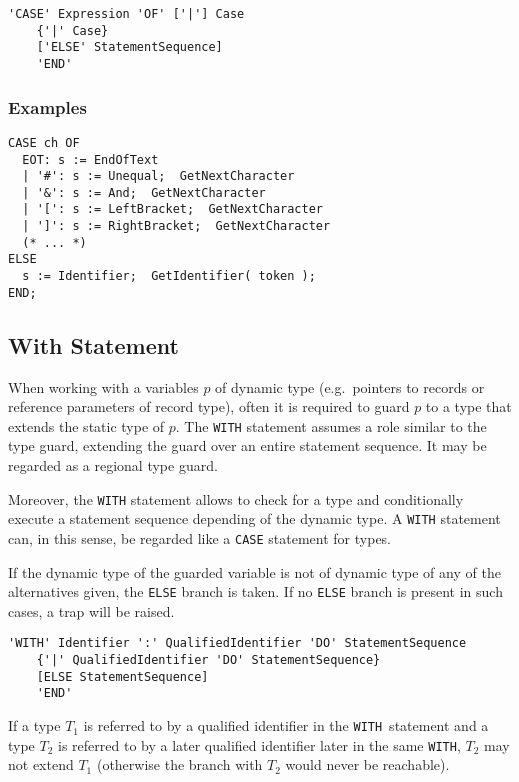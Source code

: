\documentclass[a4wide,11pt]{article}
\newcommand{\WITH}{\lstinline"WITH"}
\begin{document}
\begin{lstlisting}[style=ebnf]
'CASE' Expression 'OF' ['|'] Case
    {'|' Case}
    ['ELSE' StatementSequence]
    'END'
\end{lstlisting}

\begin{annotation}
\subsubsection{Examples}
\begin{lstlisting}[style=example]
CASE ch OF
  EOT: s := EndOfText
  | '#': s := Unequal;  GetNextCharacter
  | '&': s := And;  GetNextCharacter
  | '[': s := LeftBracket;  GetNextCharacter
  | ']': s := RightBracket;  GetNextCharacter
  (* ... *)
ELSE
  s := Identifier;  GetIdentifier( token );
END;
\end{lstlisting}
\end{annotation}

\subsection{With Statement}
When working with a variables $p$ of dynamic type (e.g.\ pointers to records or reference parameters of record type), often it is required to guard $p$ to a type that extends the static type of $p$.
The \lstinline"WITH" statement assumes a role similar to the type guard, extending the guard over an entire statement sequence.
It may be regarded as a regional type guard.

Moreover, the \lstinline"WITH" statement allows to check for a type and conditionally execute a statement sequence depending of the dynamic type.
A \lstinline"WITH" statement can, in this sense, be regarded like a \lstinline"CASE" statement for types.

If the dynamic type of the guarded variable is not of dynamic type of any of the alternatives given, the \lstinline"ELSE" branch is taken.
If no \lstinline"ELSE" branch is present in such cases, a trap will be raised.

\begin{lstlisting}[style=ebnf]
'WITH' Identifier ':' QualifiedIdentifier 'DO' StatementSequence
    {'|' QualifiedIdentifier 'DO' StatementSequence}
    [ELSE StatementSequence]
    'END'
\end{lstlisting}

If a type $T_1$ is referred to by a qualified identifier in the \WITH\ statement and a type $T_2$ is referred to by a later qualified identifier later in the same \WITH, $T_2$ may not extend $T_1$ (otherwise the branch with $T_2$ would never be reachable).
\end{document}
